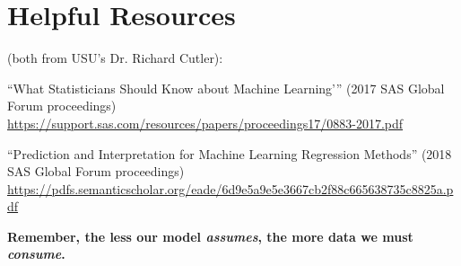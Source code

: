 \documentclass[12pt]{../notes}
\begin{document}
\section{Helpful Resources}
(both from USU’s Dr. Richard Cutler):
\bi
\item “What Statisticians Should Know about Machine Learning'” (2017 SAS Global Forum proceedings)
\url{https://support.sas.com/resources/papers/proceedings17/0883-2017.pdf}
\item “Prediction and Interpretation for Machine Learning Regression Methods” (2018 SAS Global Forum proceedings)
\url{https://pdfs.semanticscholar.org/eade/6d9e5a9e5e3667cb2f88c665638735c8825a.pdf}
\ei





\nspace
\textbf{Remember, the less our model \textit{assumes}, the more data we must \textit{consume}.}

\end{document}
